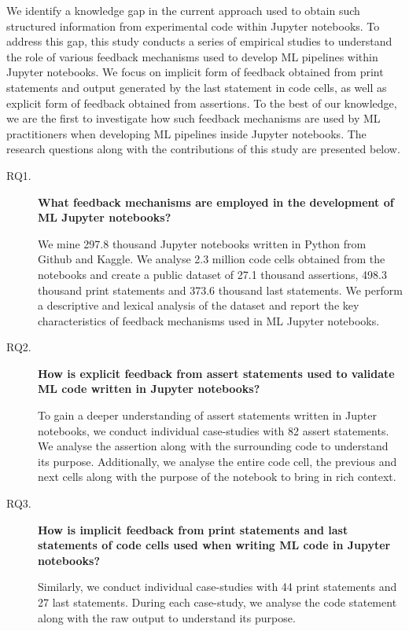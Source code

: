 We identify a knowledge gap in the current approach used to obtain such structured information from experimental code within Jupyter notebooks. To address this gap, this study conducts a series of empirical studies to understand the role of various feedback mechanisms used to develop ML pipelines within Jupyter notebooks. We focus on implicit form of feedback obtained from print statements and output generated by the last statement in code cells, as well as explicit form of feedback obtained from assertions. To the best of our knowledge, we are the first to investigate how such feedback mechanisms are used by ML practitioners when developing ML pipelines inside Jupyter notebooks. The research questions along with the contributions of this study are presented below.

\begin{description}
  \item[RQ1.] \textbf{What feedback mechanisms are employed in the development of ML Jupyter notebooks?}

    We mine 297.8 thousand Jupyter notebooks written in Python from Github and Kaggle. We analyse 2.3 million code cells obtained from the notebooks and create a public dataset of 27.1 thousand assertions, 498.3 thousand print statements and 373.6 thousand last statements. We perform a descriptive and lexical analysis of the dataset and report the key characteristics of feedback mechanisms used in ML Jupyter notebooks.


  \item[RQ2.] \textbf{How is explicit feedback from assert statements used to validate ML code written in Jupyter notebooks?}

    To gain a deeper understanding of assert statements written in Jupter notebooks, we conduct individual case-studies with 82 assert statements. We analyse the assertion along with the surrounding code to understand its purpose. Additionally, we analyse the entire code cell, the previous and next cells along with the purpose of the notebook to bring in rich context.

  \item[RQ3.] \textbf{How is implicit feedback from print statements and last statements of code cells used when writing ML code in Jupyter notebooks?}

    Similarly, we conduct individual case-studies with 44 print statements and 27 last statements. During each case-study, we analyse the code statement along with the raw output to understand its purpose.
\end{description}

